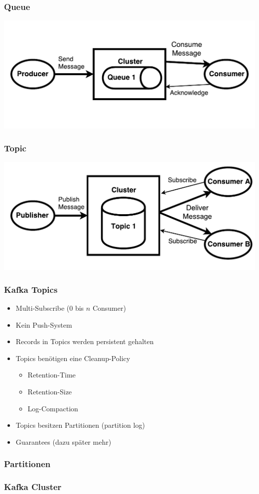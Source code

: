 \begin{frame}
\frametitle{Queue}
\begin{center}
	\centering
	\includegraphics[scale=0.6]{figure/queue_draw.pdf}
\end{center}
\end{frame}

\begin{frame}
\frametitle{Topic}
	\centering
	\includegraphics[scale=0.6]{figure/topic_draw.pdf}
\end{frame}

\begin{frame}
\frametitle{Kafka Topics}
\begin{itemize}
	\item Multi-Subscribe ($0$ bis $n$ Consumer)
	\item Kein Push-System
	\item Records in Topics werden persistent gehalten
	\item Topics benötigen eine Cleanup-Policy
		\begin{itemize}
			\item Retention-Time
			\item Retention-Size
			\item Log-Compaction
		\end{itemize}
	\item Topics besitzen Partitionen (partition log)
	\item Guarantees (dazu später mehr)
\end{itemize}
\end{frame}

\begin{frame}
\frametitle{Partitionen}

\end{frame}

\begin{frame}
\frametitle{Kafka Cluster}

\end{frame}